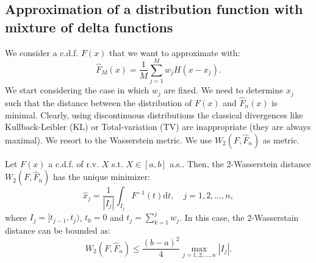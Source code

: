 \subsection{Approximation of a distribution function with mixture of delta functions}
We consider a c.d.f. $F(x)$ that we want to approximate with:
\begin{equation}
	\widehat{F}_M(x) = \frac{1}{M} \sum_{j=1}^M w_j H(x-x_j).
\end{equation}
We start considering the case in which $w_j$ are fixed.
We need to determine $x_j$ such that the distance between the distribution of $F(x)$ and $\widehat{F}_n(x)$ is minimal. Clearly, using discontinuous distributions the classical divergences like Kullback-Leibler (KL) or Total-variation (TV) are inappropriate (they are always maximal). We resort to the Wasserstein metric. We use $W_2(F, \widehat{F}_n)$ as metric.

\begin{theorem}
	Let $F(x)$ a c.d.f. of r.v. $X$ s.t. $X \in [a,b]$ a.s.. Then, the 2-Wasserstein distance $W_2(F, \widehat{F}_n)$ has the unique minimizer:
    \begin{equation}
    	\widehat{x}_j = \frac{1}{|I_j|} \int_{I_j} F^{-1}(t) \mathrm{d} t, \quad j=1,2,\dots, n,
    \end{equation}
    where $I_j=[t_{j-1}, t_j)$, $t_0 = 0$ and $t_j = \sum_{k=1}^j w_j$. In this case, the 2-Wasserstain distance can be bounded as:
    \begin{equation}
    	W_2(F, \widehat{F}_n) \le \frac{(b-a)^2}{4} \max_{j=1,2,\dots,n} |I_j|.
    \end{equation}
\end{theorem}


